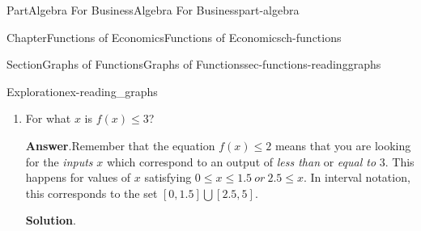\documentclass[oneside,10pt,]{tufte-book}
\newcommand{\blocktitlefont}{\relax}
\numberwithin{equation}{chapter}
\newcommand{\lt}{<}
\begin{document}
\begin{partptx}{Part}{Algebra For Business}{}{Algebra For Business}{}{}{part-algebra}
\begin{chapterptx}{Chapter}{Functions of Economics}{}{Functions of Economics}{}{}{ch-functions}
\begin{sectionptx}{Section}{Graphs of Functions}{}{Graphs of Functions}{}{}{sec-functions-readinggraphs}
\begin{exploration}{Exploration}{}{ex-reading_graphs}
\begin{enumerate}[font=\bfseries,label=(\alph*),ref=\alph*]
\begin{image}{0.25}{0.5}{0.25}{}
{
}%
\end{image}%
Remember that the equation \(f(x)\lt 2\) means that you are looking for the \emph{inputs} \(x\) which correspond to an output of \emph{strictly less than} \(2\). To understand this inequality, follow the graph of the function, moving through  \(x\)-values from left to right.%
\par
Above \(x=0\), the height is \(1\) which is less than \(2\). Moving right, the height of the function increases, but stays below \(2\) until we reach \(x=1\). That means that the function is \emph{less than} or \emph{equal to} 2 on the interval \([0,1]\). But because we want the height to be \emph{strictly less than} 2, we must exclude 1, giving us the interval \([0,1)\).%
\par
Similarly, the height is also less than 2 between \(x=3\) and \(x=5\), and equal to 2 at those endpoints, so the function is \emph{strictly less than} 2 on the interval \((3,5)\)%
\par
Putting it all together, we have that \(f(x)\lt 2\) on the set \([0,1)\bigcup (3,5)\), or equivalently when \(0\leq x\lt 1\ or\ 3\lt x\lt 5\).%
\item{}For what  \(x\) is \(f(x)\leq 3\)?%
\par\smallskip%
\noindent\textbf{\blocktitlefont Answer}.\hypertarget{ex-reading_graphs-5-2}{}\quad{}Remember that the equation \(f(x)\leq 2\) means that you are looking for the \emph{inputs} \(x\) which correspond to an output of \emph{less than} or \emph{equal to} \(3\). This happens for values of \(x\) satisfying \(0\leq x\leq 1.5\ or\ 2.5 \leq x\). In interval notation, this corresponds to the set \([0,1.5]\bigcup [2.5,5]\).%
\par\smallskip%
\noindent\textbf{\blocktitlefont Solution}.\hypertarget{ex-reading_graphs-5-3}{}\quad{}\begin{image}{0.25}{0.5}{0.25}{}%
\end{image}
\end{enumerate}
\end{exploration}
\end{sectionptx}
\end{chapterptx}
\end{partptx}
\end{document}
